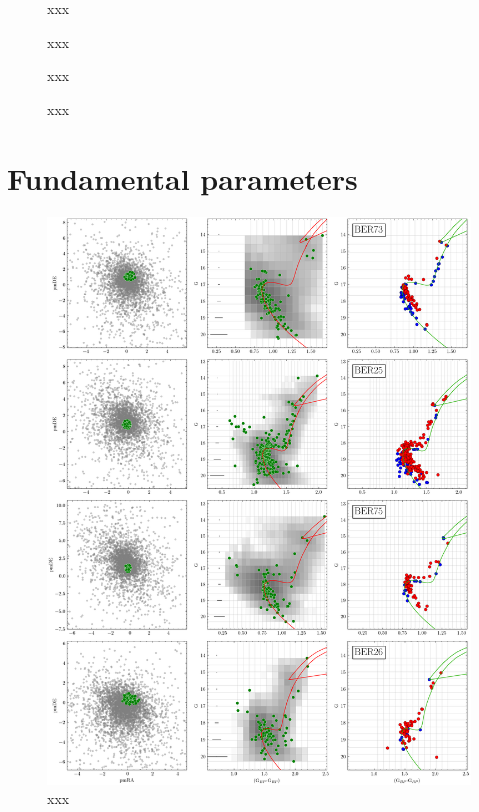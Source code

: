 \documentclass{aa}
\begin{document}
\begin{appendix}
 \begin{figure}
  \caption{xxx}
  \label{fig:8struct}
 \end{figure}

 \begin{figure}
  \caption{xxx}
  \label{fig:12struct}
 \end{figure}

 \begin{figure}
  \caption{xxx}
  \label{fig:16struct}
 \end{figure}

 \begin{figure}
  \caption{xxx}
  \label{fig:20struct}
 \end{figure}


\section{Fundamental parameters}
\label{app:fundam_params}

 \begin{figure}[t]
  \centering
  \includegraphics[height=.95\textheight]{figs/0_fpars.png}
  \caption{xxx}
  \label{fig:0fpars}
 \end{figure}


\end{appendix}
\end{document}
